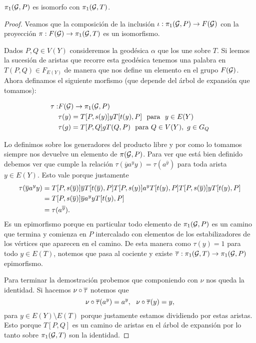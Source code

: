 \documentclass[tesis.tex]{subfiles}
\begin{document}
\begin{teo}\label{teo_grp_fund_iso}
	$\pi_1({\cal G}, P)$ es isomorfo con $\pi_1({\cal G}, T)$.
\end{teo}
\begin{proof}
	Veamos que la composición de la inclusión $\iota: \pi_1( {\cal G} ,P)  \to F({\cal G})$ con la proyección $\pi: F({\cal G}) \to \pi_1({\cal G}, T)$ es un isomorfismo.
	
	Dados $P,Q \in V(Y)$ consideremos la geodésica $\alpha$ que los une sobre $T$.
	Si leemos la sucesión de aristas que recorre esta geodésica tenemos una palabra en $T(P,Q) \in F_{E(Y)}$ de manera que nos define un elemento en el grupo $F({\cal G})$.
	Ahora definamos el siguiente morfismo (que depende del árbol de expansión que tomamos):
	
	\begin{align*}
		\tau: & F(\cG) \to \pi_1(\cG,P)  \\
		& \tau(y) = T[P,s(y)]yT[t(y),P] \ \ \text{para } \ y\in E(Y) \\
		& \tau(g) = T[P,Q] g T(Q,P) \ \  \text{para} \ Q \in V(Y), \ g \in G_Q
	\end{align*}
	
	Lo definimos sobre los generadores del producto libre y por como lo tomamos siempre nos devuelve un elemento de $\pi({\cal G}, P)$.
	Para ver que está bien definido debemos ver que cumple la relación $\tau(\overline y a^y y) = \tau (a^{\overline y})$ para toda arista $y \in E(Y)$.
	Esto vale porque justamente 
	\begin{align*}
		\tau(\overline y a^y y) & = T[P,s(\overline y)]\overline yT[t(\overline y),P] T[P,s(y)] a^y T[t(y),P] T[P,s(\overline y)]yT[t( y),P] \\
		& = T[P,s(\overline y)]  \overline y a^y y T[t( y),P] \\
		& = \tau (a^{\overline y}).
	\end{align*}
	Es un epimorfismo porque en particular todo elemento de $\pi_1({\cal G}, P)$ es un camino que termina y comienza en $P$ intercalado con elementos de los estabilizadores de los vértices que aparecen en el camino.
	De esta manera como $\tau(y)=1$ para todo $y \in E(T)$, notemos que pasa al cociente y existe $\overline \tau: \pi_{1}({\cal G}, T) \to \pi_1 ({\cal G}, P)$ epimorfismo.
	
	Para terminar la demostración probemos que componiendo con $\nu$ nos queda la identidad.
	Si hacemos $\nu \circ \overline \tau$ notemos que 
	\begin{equation*}
		\nu \circ \overline \tau (a^y) = a^y, \ \ \nu \circ \overline \tau (y) = y, 
	\end{equation*}
	para $y \in E(Y) \setminus E(T)$ porque justamente estamos dividiendo por estas aristas. 
	Esto porque $T[P,Q]$ es un camino de aristas en el árbol de expansión por lo tanto sobre $\pi_1({\cal G}, T)$ son la identidad.
\end{proof}
\end{document}
